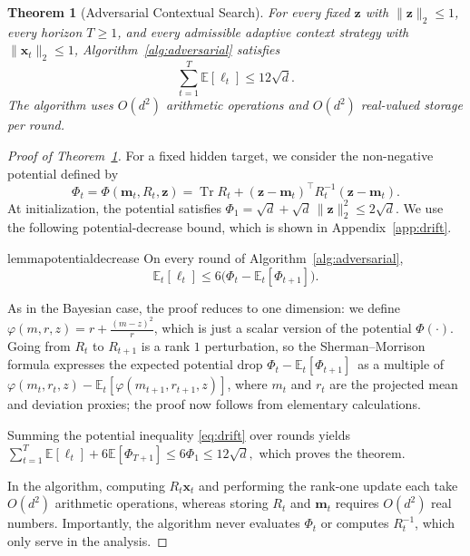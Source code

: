 \documentclass[11pt]{article}
\newtheorem{theorem}{Theorem}[section]
\newcommand{\E}[1]{\mathbb E\left[#1\right]}
\newcommand{\Esub}[2]{\mathbb E_{#1}\left[#2\right]}
\DeclareMathOperator{\Tr}{Tr}
\newcommand{\norm}[1]{\lVert #1\rVert_2}
\newcommand{\bm}{\boldsymbol m}
\newcommand{\bx}{\boldsymbol x}
\newcommand{\bz}{\boldsymbol z}
\begin{document}
\begin{theorem}[Adversarial Contextual Search]\label{thm:main}
For every fixed $\bz$ with $\norm{\bz}\le1$, every horizon $T\ge1$, and every admissible adaptive context strategy with $\norm{\bx_t}\le1$, Algorithm~\ref{alg:adversarial} satisfies
\begin{equation}\label{eq:adversarial-guarantee}
 \sum_{t=1}^T\E{\ell_t}\le12\sqrt d.
\end{equation}
The algorithm uses $O(d^2)$ arithmetic operations and $O(d^2)$ real-valued storage per round.
\end{theorem}

\begin{proof}[Proof of Theorem~\ref{thm:main}]
For a fixed hidden target, we consider the non-negative potential defined by
\begin{equation}\label{eq:potential}
 \Phi_t=\Phi(\bm_t,R_t,\bz)
 =\Tr R_t+(\bz-\bm_t)^\top R_t^{-1}(\bz-\bm_t).
\end{equation}
At initialization, the potential {satisfies}
\(
\Phi_1=\sqrt d+\sqrt d\,\norm{\bz}^2\le2\sqrt d.
\)
We use the following potential-decrease bound, which is shown in
Appendix~\ref{app:drift}. 
\begin{restatable}{lemma}{potentialdecrease}\label{lem:drift}
On every round of Algorithm~\ref{alg:adversarial},
\begin{equation}\label{eq:drift}
 \Esub{t}{\ell_t}\le6\bigl(\Phi_t-\Esub{t}{\Phi_{t+1}}\bigr).
\end{equation}
\end{restatable}


{As in the Bayesian case, the proof reduces to one dimension:} we define
$\varphi(m,r,z)=r+\frac{(m-z)^2}{r}$, which is just a scalar version
of the potential $\Phi(\cdot)$. Going from $R_t$ to $R_{t+1}$ is a
rank $1$ perturbation, {so the Sherman--Morrison formula expresses the expected potential drop}
$\Phi_t-\Esub{t}{\Phi_{t+1}}${\ as a multiple of}
$\varphi(m_t,r_t,z) - \Esub{t}{\varphi(m_{t+1},r_{t+1},z)}$, where $m_t$ and
$r_t$ are the projected mean and deviation proxies; 
the proof now follows from elementary calculations. 

Summing the {potential inequality} \eqref{eq:drift} over rounds yields
\(
 \sum_{t=1}^T\E{\ell_t}+6{\E{\Phi_{T+1}}}
 \le6\Phi_1\le12\sqrt d,
\)
which proves the theorem. 

In the algorithm, computing $R_t\bx_t$ and performing the rank-one update each take $O(d^2)$ arithmetic operations, whereas storing $R_t$ and $\bm_t$ requires $O(d^2)$ real numbers. Importantly, the algorithm never evaluates $\Phi_t$ or computes $R_t^{-1}$, which only serve in the analysis. 
\end{proof}
\end{document}

